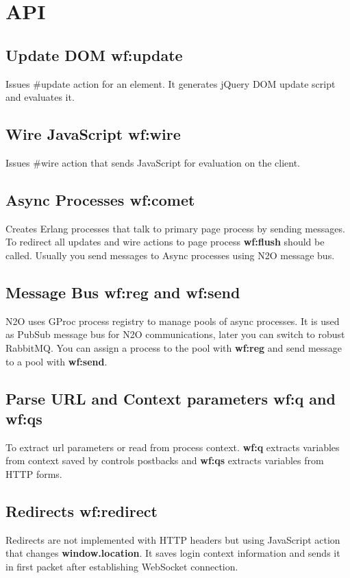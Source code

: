 \section{API}

\subsection{Update DOM \bf{wf:update}}
Issues \#update{} action for an element.
It generates jQuery DOM update script and evaluates it.

\subsection{Wire JavaScript \bf{wf:wire}}
Issues \#wire{} action that sends JavaScript for evaluation on the client.

\subsection{Async Processes \bf{wf:comet}}
Creates Erlang processes that talk to primary page process by sending messages.
To redirect all updates and wire actions to page process {\bf wf:flush} should be called.
Usually you send messages to Async processes using N2O message bus.

\subsection{Message Bus {\bf wf:reg} and {\bf wf:send}}
N2O uses GProc process registry to manage pools of async processes.
It is used as PubSub message bus for N2O communications, later you can switch to robust RabbitMQ.
You can assign a process to the pool with {\bf wf:reg} and send message to a pool with {\bf wf:send}.

\subsection{Parse URL and Context parameters {\bf wf:q} and {\bf wf:qs}}
To extract url parameters or read from process context. {\bf wf:q} extracts variables
from context saved by controls postbacks and {\bf wf:qs} extracts variables from HTTP forms.

\subsection{Redirects {\bf wf:redirect}}
Redirects are not implemented with HTTP headers but using JavaScript action that changes {\bf window.location}.
It saves login context information and sends it in first packet after establishing WebSocket connection.

